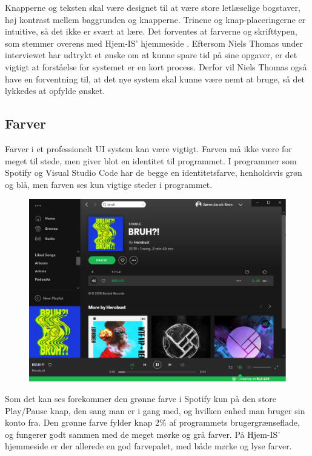 Knapperne og teksten skal være designet til at være store letlæselige bogstaver, høj kontrast mellem baggrunden og knapperne. Trinene og knap-placeringerne er intuitive, så det ikke er svært at lære.
Det forventes at farverne og skrifttypen, som stemmer overens med Hjem-IS' hjemmeside \cite{hjemis}. Eftersom Niels Thomas under interviewet har udtrykt et ønske om at kunne spare tid på sine opgaver, er det vigtigt at forståelse for systemet er en kort process. Derfor vil Niels Thomas også have en forventning til, at det nye system skal kunne være nemt at bruge, så det lykkedes at opfylde ønsket.

\subsection{Farver}
Farver i et professionelt UI system kan være vigtigt. Farven må ikke være for meget til stede, men giver blot en identitet til programmet. I programmer som Spotify og Visual Studio Code har de begge en identitetsfarve, henholdsvis grøn og blå, men farven ses kun vigtige steder i programmet. 
\begin{figure}
    \centering
    \includegraphics[width=\textwidth]{figures/Preliminary/Spotify.png}
    \label{fig:spotify}
\end{figure}
Som det kan ses forekommer den grønne farve i Spotify kun på den store Play/Pause knap, den sang man er i gang med, og hvilken enhed man bruger sin konto fra. Den grønne farve fylder knap 2\% af programmets brugergrænseflade, og fungerer godt sammen med de meget mørke og grå farver. 
På Hjem-IS' hjemmeside \cite{hjemis} er der allerede en god farvepalet, med både mørke og lyse farver. 

